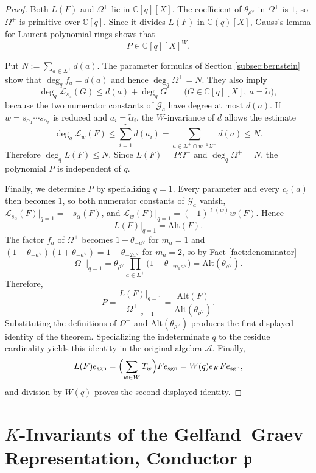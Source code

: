 \documentclass[12pt]{article}
\numberwithin{equation}{section}
\theoremstyle{definition}
\theoremstyle{remark}
\theoremstyle{plain}
\begin{document}
\begin{proof}
Both $L(F)$ and $\Omega^+$ lie in $\mathbb C[q][X]$. The coefficient of $\theta_{\rho^\vee}$ in $\Omega^+$ is $1$, so $\Omega^+$ is primitive over $\mathbb C[q]$. Since it divides $L(F)$ in $\mathbb C(q)[X]$, Gauss's lemma for Laurent polynomial rings shows that
\[P\in\mathbb C[q][X]^W.\]

Put $N:=\sum_{a\in\Sigma^+}d(a)$. The parameter formulas of Section \ref{subsec:bernstein} show that $\deg_q f_a=d(a)$ and hence $\deg_q\Omega^+=N$. They also imply
$$\deg_q\mathcal L_{s_\alpha}(G)\leq d(a)+\deg_qG \qquad \bigl(G\in\mathbb C[q][X],\ a=\tilde\alpha\bigr),$$
because the two numerator constants of $\mathcal G_a$ have degree at most $d(a)$. If $w=s_{\alpha_1}\cdots s_{\alpha_r}$ is reduced and $a_i=\tilde\alpha_i$, the $W$-invariance of $d$ allows the estimate
$$\deg_q\mathcal L_w(F)\leq\sum_{i=1}^r d(a_i)
=\sum_{a\in\Sigma^+\cap w^{-1}\Sigma^-}d(a)\leq N.$$
Therefore $\deg_qL(F)\leq N$. Since $L(F)=P\Omega^+$ and $\deg_q\Omega^+=N$, the polynomial $P$ is independent of $q$.

Finally, we determine $P$ by specializing $q = 1$. Every parameter and every $c_i(a)$ then becomes $1$, so both numerator constants of $\mathcal{G}_a$ vanish, $\mathcal{L}_{s_{\alpha}} (F)\vert_{q = 1} = -s_{\alpha}(F)$, and $\mathcal{L}_{w} (F)\vert_{q = 1} = (-1)^{\ell(w)} w(F)$. Hence
$$L(F)\vert_{q = 1} = \mathrm{Alt}(F).$$
The factor $f_a$ of $\Omega^{+}$ becomes $1 - \theta_{-a^\vee}$ for $m_a = 1$ and $(1-\theta_{-a^\vee})(1+\theta_{-a^\vee}) = 1 - \theta_{-2a^\vee}$ for $m_a = 2$, so by Fact \ref{fact:denominator}
$$\Omega^{+}\vert_{q=1} = \theta_{\rho^\vee} \prod_{a \in \Sigma^+} \big(1 - \theta_{-m_a a^\vee}\big) = \mathrm{Alt}(\theta_{\rho^{\vee}}).$$
Therefore,
\[P = \frac{L(F)\vert_{q = 1}}{\Omega^{+}\vert_{q=1}} = \frac{\mathrm{Alt}(F)}{ \mathrm{Alt}(\theta_{\rho^{\vee}})}.\]
Substituting the definitions of $\Omega^+$ and $\mathrm{Alt}(\theta_{\rho^\vee})$ produces the first displayed identity of the theorem. Specializing the indeterminate $q$ to the residue cardinality yields this identity in the original algebra $\mathcal A$. Finally,
$$L(F)e_{\mathrm{sgn}}=\Bigl(\sum_{w\in W}T_w\Bigr)Fe_{\mathrm{sgn}}=W(q)e_KFe_{\mathrm{sgn}},$$
and division by $W(q)$ proves the second displayed identity.
\end{proof}


\section[\texorpdfstring{$K$}{K}-Invariants of the Gelfand--Graev Representation, Conductor \texorpdfstring{$\mathfrak{p}$}{p}]{\fontsize{15}{18}\selectfont \texorpdfstring{$K$}{K}-Invariants of the Gelfand--Graev Representation, Conductor \texorpdfstring{$\mathfrak{p}$}{p}}\label{sec:ggp}
\end{document}
